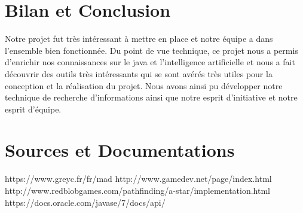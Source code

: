 \documentclass[a4paper,12pt]{article} %
\begin{document}
\section{Bilan et Conclusion}
Notre projet fut très intéressant à mettre en place et notre équipe a dans l'ensemble bien fonctionnée.
\newline\newline
Du point de vue technique, ce projet nous a permis d'enrichir nos connaissances sur le java et l'intelligence artificielle et nous a fait découvrir des outils très intéressants  qui se sont avérés très utiles pour la conception et la réalisation du projet.
\newline\newline
Nous avons ainsi pu développer notre technique de recherche d'informations ainsi que notre esprit d'initiative et notre esprit d'équipe.
\newpage
\section{Sources et Documentations}
\noindent
\newline\newline
https://www.greyc.fr/fr/mad 
\newline\newline
http://www.gamedev.net/page/index.html
\newline\newline
http://www.redblobgames.com/pathfinding/a-star/implementation.html
\newline\newline
https://docs.oracle.com/javase/7/docs/api/
\end{document}
